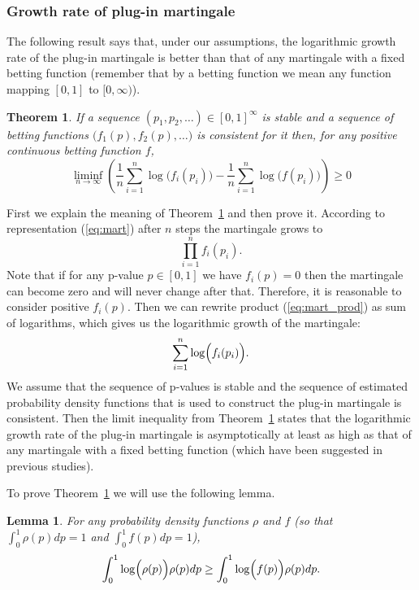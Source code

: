 \documentclass{article}
\newtheorem{theorem}{Theorem}
\newtheorem{lemma}{Lemma}
\theoremstyle{definition}
\begin{document}
\subsubsection{Growth rate of plug-in martingale}

The following result says
that, under our assumptions, the logarithmic growth rate of the plug-in martingale
is better than that of any martingale with a fixed betting function
(remember that by a betting function we mean any function mapping $[0,1]$ to $[0,\infty)$).
\begin{theorem}\label{thm:plug-in_result}
If a sequence $(p_1,p_2,\ldots)\in[0,1]^{\infty}$ is stable and
a sequence of betting functions $\bigl(f_1(p), f_2(p),\ldots\bigr)$ is consistent for it
then, for any positive continuous betting function $f$,
$$
  \liminf_{n\rightarrow\infty}\left(\frac{1}{n} \sum_{i=1}^n\log\bigl(f_i(p_i)\bigr) -
  \frac{1}{n} \sum_{i=1}^n\log\bigl(f(p_i)\bigr)\right) \geq 0
$$
\end{theorem}

First we explain the meaning of Theorem~\ref{thm:plug-in_result} and then prove it.
According to representation (\ref{eq:mart}) after $n$ steps the martingale grows to
\begin{equation}
\label{eq:mart_prod}
\prod_{i=1}^n f_i(p_i).
\end{equation}
Note that if for any p-value $p\in [0,1] $ we have $f_i(p)=0$
then the martingale can become zero and will never change after that.
Therefore, it is reasonable to consider positive $f_i(p)$.
Then we can rewrite product (\ref{eq:mart_prod}) as sum of logarithms,
which gives us the logarithmic growth of the martingale:
$$\sum_{i=1}^n \log \Bigl( f_i(p_i) \Bigr).$$
We assume that the sequence of p-values is stable and the
sequence of estimated probability density functions that is used to construct the plug-in
martingale is consistent.
Then the limit inequality from Theorem~\ref{thm:plug-in_result} states
that the logarithmic growth rate of the plug-in martingale is asymptotically at least as high as that
of any martingale with a fixed betting function (which have been suggested in previous studies).

To prove Theorem~\ref{thm:plug-in_result} we will use the following lemma.
\begin{lemma}\label{thm:lem1}
  For any probability density functions $\rho$ and $f$
  (so that $\int_0^1 \rho(p) dp =1$ and $\int_0^1 f(p)d p = 1$),
  $$
    \int_0^1 \log\Bigl(\rho(p)\Bigr)\rho(p) dp \geq \int_0^1 \log\Bigl(f(p)\Bigr)\rho(p) dp.
  $$
\end{lemma}
\end{document}
